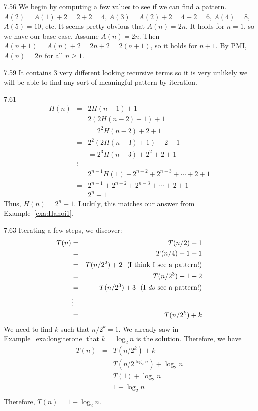 \begin{Answer}{7.56}
We begin by computing a few values to see if we can find a pattern.
$A(2)=A(1)+2 = 2+2= 4$, $A(3)=A(2)+2=4+2=6$, $A(4)=8$, $A(5)=10$, etc.
It seems pretty obvious that $A(n)=2n$.  It holds for $n=1$, so we have our base case.
Assume $A(n)=2n$.  Then $A(n+1)=A(n)+2 = 2n+2=2(n+1)$, so it holds for $n+1$.
By PMI, $A(n)=2n$ for all $n\geq 1$.
\end{Answer}
\begin{Answer}{7.59}
It contains 3 very different looking recursive terms so it is very unlikely we will
be able to find any sort of meaningful pattern by iteration.
\end{Answer}
\begin{Answer}{7.61}
\begin{eqnarray*}
H(n)&=&2 H(n-1) + 1\\
&=&2(2 H(n-2) + 1) + 1\\
&&= 2^2 H(n-2) + 2 + 1\\
&=&2^2(2 H(n-3) + 1) + 2 + 1\\
&&= 2^3 H(n-3) + 2^2 + 2 + 1\\
&\vdots&\\
&=&2^{n-1}H(1) + 2^{n-2} + 2^{n-3}+\cdots + 2 + 1\\
&=&2^{n-1} + 2^{n-2} + 2^{n-3}+\cdots + 2 + 1\\
&=&2^n-1
\end{eqnarray*}
Thus, $H(n)=2^n-1$. Luckily, this matches our answer from Example~\ref{exa:Hanoi1}.
\end{Answer}
\begin{Answer}{7.63}
Iterating a few steps, we discover:
\begin{eqnarray*}
T(n)&=&T(n/2)+1\\
&=&T(n/4)+1+1\\
&=&T(n/2^2)+2\, \, \, \, \mbox{(I think I see a pattern!)}\\
&=&T(n/2^3)+1+2\\
&=&T(n/2^3)+3\, \, \, \, \mbox{(I {\em do} see a pattern!)}\\
&\vdots&\\
&=&T(n/2^k)+k\\
\end{eqnarray*}
We need to find $k$ such that $n/2^k=1$.
We already saw in Example~\ref{exa:longiterone} that $k=\log_2 n$ is the solution.
Therefore, we have
\begin{eqnarray*}
T(n)&=&T(n/2^k)+k\\
&=&T(n/2^{\log_2 n})+\log_2 n\\
&=&T(1)+\log_2 n\\
&=&1+\log_2 n\\
\end{eqnarray*}
Therefore,
$T(n)=1+\log_2 n$.
\end{Answer}
